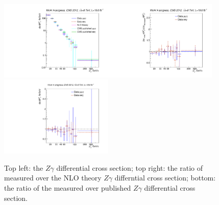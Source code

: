 \begin{figure}[htb]
  \begin{center}
   \includegraphics[width=0.48\textwidth]{../figs/figs_v11/ChannelsMERGED_ZGamma/CrossSection/compareCSZGamma.pdf}\includegraphics[width=0.48\textwidth]{../figs/figs_v11/ChannelsMERGED_ZGamma/CrossSection/compareCSratioTheoryZGamma.pdf}
   \includegraphics[width=0.48\textwidth]{../figs/figs_v11/ChannelsMERGED_ZGamma/CrossSection/compareCSratioOttoZGamma.pdf}
     
  \caption{Top left: the $Z\gamma$ differential cross section; top right: the ratio of measured over the NLO theory $Z\gamma$ differntial cross section; bottom: the ratio of the measured over published $Z\gamma$ differential cross section. }
  \label{fig:CS_Zg}
 \end{center}
\end{figure}

